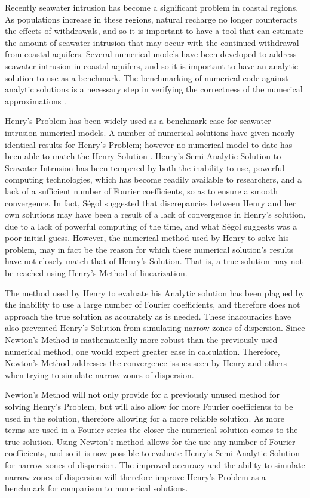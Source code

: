 Recently seawater intrusion has become a significant problem in coastal regions.  As populations
increase in these regions, natural recharge no longer counteracts the effects of withdrawals, and so
it is important to have a tool that can estimate the amount of seawater intrusion that may occur
with the continued withdrawal from coastal aquifers. Several numerical models have been developed to
address seawater intrusion in coastal aquifers, and so it is important to have an analytic solution
to use as a benchmark. The benchmarking of numerical code against analytic solutions is a necessary
step in verifying the correctness of the numerical approximations \cite{Simpson}.

Henry's Problem has been widely used as a benchmark case for seawater intrusion numerical models. A
number of numerical solutions have given nearly identical results for Henry's Problem; however no
numerical model to date has been able to match the Henry Solution \cite{Voss}. Henry's Semi-Analytic
Solution to Seawater Intrusion has been tempered by both the inability to use, powerful computing
technologies, which has become readily available to researchers, and a lack of a sufficient number
of Fourier coefficients, so as to ensure a smooth convergence.  In fact, S\'egol \cite{Segol}
suggested that discrepancies between Henry and her own solutions may have been a result of a lack of
convergence in Henry's solution, due to a lack of powerful computing of the time, and what S\'egol
suggests was a poor initial guess. However, the numerical method used by Henry to solve his problem,
may in fact be the reason for which these numerical solution's results have not closely match that
of Henry's Solution. That is, a true solution may not be reached using Henry's Method of
linearization.

The method used by Henry to evaluate his Analytic solution has been plagued by the inability to use
a large number of Fourier coefficients, and therefore does not approach the true solution as
accurately as is needed. These inaccuracies have also prevented Henry's Solution from simulating
narrow zones of dispersion. Since Newton's Method is mathematically more robust than the previously
used numerical method, one would expect greater ease in calculation.  Therefore, Newton's Method
addresses the convergence issues seen by Henry and others when trying to simulate narrow zones of
dispersion.

Newton's Method will not only provide for a previously unused method for solving Henry's Problem,
but will also allow for more Fourier coefficients to be used in the solution, therefore allowing for
a more reliable solution. As more terms are used in a Fourier series the closer the numerical
solution comes to the true solution. Using Newton's method allows for the use any number of Fourier
coefficients, and so it is now possible to evaluate Henry's Semi-Analytic Solution for narrow zones
of dispersion. The improved accuracy and the ability to simulate narrow zones of dispersion will
therefore improve Henry's Problem as a benchmark for comparison to numerical solutions.


